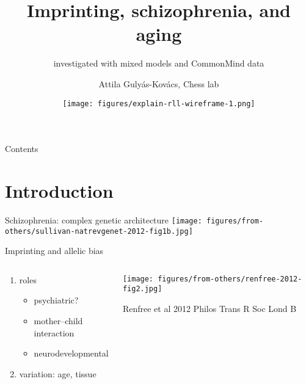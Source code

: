 \documentclass[usenames,dvipsnames]{beamer} %
\title{Imprinting, schizophrenia, and aging}
\subtitle{investigated with mixed models and CommonMind data}
\author{Attila Guly\'{a}s-Kov\'{a}cs, Chess lab}
\date{\texttt{[image: figures/explain-rll-wireframe-1.png]}}
\begin{document}
\begin{frame}[plain, label=title]
\maketitle
\end{frame}

\begin{frame}{Contents}
\tableofcontents
\end{frame}

\section{Introduction}

\begin{frame}{Schizophrenia: complex genetic architecture}
\texttt{[image: figures/from-others/sullivan-natrevgenet-2012-fig1b.jpg]}
\end{frame}

\begin{frame}{Imprinting and allelic bias}
\begin{columns}[t]
\begin{column}{0.5\textwidth}
\begin{enumerate}
\item roles
\begin{itemize}
\item psychiatric?
\item mother--child interaction
\item neurodevelopmental 
\end{itemize}
\item variation: age, tissue
\end{enumerate}
\end{column}

\begin{column}{0.5\textwidth}

\texttt{[image: figures/from-others/renfree-2012-fig2.jpg]}

{\tiny Renfree et al 2012 Philos Trans R Soc Lond B}
\end{column}
\end{columns}
\end{frame}
\end{document}
